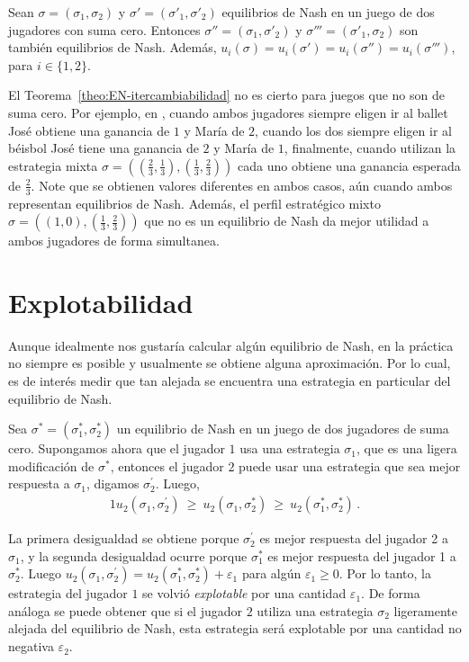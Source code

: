 \begin{theorem}
\label{theo:EN-itercambiabilidad}
Sean $\sigma = (\sigma_1, \sigma_2)$ y $\sigma' = (\sigma'_1, \sigma'_2)$ equilibrios de Nash en un juego de dos jugadores con suma cero. Entonces $\sigma'' = (\sigma_1, \sigma'_2)$ y $\sigma''' = (\sigma'_1, \sigma_2)$ son también equilibrios de Nash. Además, $u_i(\sigma) = u_i(\sigma') = u_i(\sigma'') = u_i(\sigma''')$, para $i \in \{1, 2\}$.
\end{theorem}

El Teorema~\ref{theo:EN-itercambiabilidad} no es cierto para juegos que no son de suma cero. Por ejemplo, en , cuando ambos jugadores siempre eligen ir al ballet José obtiene una ganancia de $1$ y María de $2$, cuando los dos siempre eligen ir al béisbol José tiene una ganancia de $2$ y María de $1$, finalmente, cuando utilizan la estrategia mixta $\sigma = \left(\left(\frac{2}{3}, \frac{1}{3}\right), \left(\frac{1}{3}, \frac{2}{3}\right)\right)$ cada uno obtiene una ganancia esperada de $\frac{2}{3}$. Note que se obtienen valores diferentes en ambos casos, aún cuando ambos representan equilibrios de Nash. Además, el perfil estratégico mixto $\sigma = \left((1, 0), \left(\frac{1}{3}, \frac{2}{3}\right)\right)$ que no es un equilibrio de Nash da mejor utilidad a ambos jugadores de forma simultanea.

\section{Explotabilidad}
\label{section:explotabilidad}

Aunque idealmente nos gustaría calcular algún equilibrio de Nash, en la práctica no siempre es posible y usualmente se obtiene alguna aproximación. Por lo cual, es de interés medir que tan alejada se encuentra una estrategia en particular del equilibrio de Nash.

Sea $\sigma^* = (\sigma^*_1, \sigma^*_2)$ un equilibrio de Nash en un juego de dos jugadores de suma cero. Supongamos ahora que el jugador $1$  usa una estrategia $\sigma_1$, que es una ligera modificación de $\sigma^*$, entonces el jugador $2$ puede usar una estrategia que sea mejor respuesta a $\sigma_1$, digamos $\sigma^{\prime}_2$. Luego,
\begin{alignat}{1}
u_2(\sigma_1, \sigma^{\prime}_2)\ \geq\ u_2(\sigma_1, \sigma^*_2)\ \geq\ u_2(\sigma^*_1, \sigma^*_2) \,.
\end{alignat}

La primera desigualdad se obtiene porque $\sigma^{\prime}_2$ es mejor respuesta del jugador 2 a $\sigma_1$, y la segunda desigualdad ocurre porque $\sigma^*_1$ es mejor respuesta del jugador 1 a $\sigma^*_2$. Luego $u_2(\sigma_1, \sigma^{\prime}_2) = u_2(\sigma^*_1, \sigma^*_2) + \varepsilon_1$ para algún $\varepsilon_1 \geq 0$. Por lo tanto, la estrategia del jugador $1$ se volvió \textit{explotable} por una cantidad $\varepsilon_1$. De forma análoga se puede obtener que si el jugador $2$ utiliza una estrategia $\sigma_2$ ligeramente alejada del equilibrio de Nash, esta estrategia será explotable por una cantidad no negativa $\varepsilon_2$.

